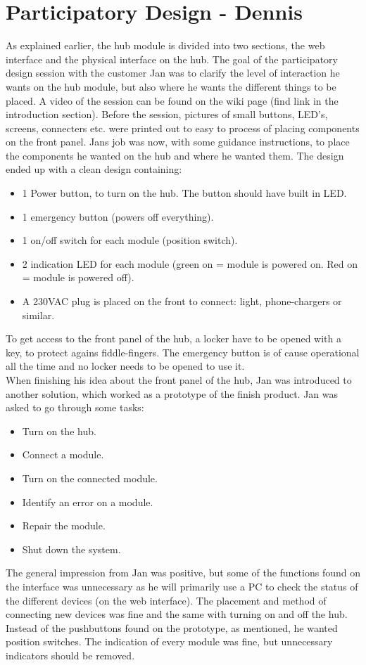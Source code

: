 \section{Participatory Design - Dennis}
As explained earlier, the hub module is divided into two sections, the web interface and the physical interface on the hub. 
The goal of the participatory design session with the customer Jan was to clarify the level of interaction he wants on the hub module, but also where he wants the different things to be placed. A video of the session can be found on the wiki page (find link in the introduction section). Before the session, pictures of small buttons, LED's, screens, connecters etc. were printed out to easy to process of placing components on the front panel. Jans job was now, with some guidance instructions, to place the components he wanted on the hub and where he wanted them. The design ended up with a clean design containing: 
\begin{itemize}
	\item 1 Power button, to turn on the hub. The button should have built in LED.
	\item 1 emergency button (powers off everything).
	\item 1 on/off switch for each module (position switch).
	\item 2 indication LED for each module (green on = module is powered on. Red on = module is powered off).
	\item A 230VAC plug is placed on the front to connect: light, phone-chargers or similar. 
\end{itemize}
To get access to the front panel of the hub, a locker have to be opened with a key, to protect agains fiddle-fingers. The emergency button is of cause operational all the time and no locker needs to be opened to use it.
\\When finishing his idea about the front panel of the hub, Jan was introduced to another solution, which worked as a prototype of the finish product. Jan was asked to go through some tasks:
\begin{itemize}
	\item Turn on the hub.
	\item Connect a module.
	\item Turn on the connected module.
	\item Identify an error on a module.
	\item Repair the module.
	\item Shut down the system.
\end{itemize}
The general impression from Jan was positive, but some of the functions found on the interface was unnecessary as he will primarily use a PC to check the status of the different devices (on the web interface). The placement and method of connecting new devices was fine and the same with turning on and off the hub. Instead of the pushbuttons found on the prototype, as mentioned, he wanted position switches. The indication of every module was fine, but unnecessary indicators should be removed. 
